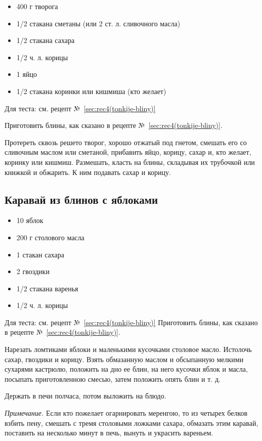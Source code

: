 \begin{itemize}
	\item 400 г творога 
    \item 1/2 стакана сметаны (или 2 ст. л. сливочного масла) 
    \item 1/2 стакана сахара
    \item 1/2 ч. л. корицы 
    \item 1 яйцо 
    \item 1/2 стакана коринки или кишмиша (кто желает)
\end{itemize}

Для теста: см. рецепт №~\ref{sec:rec4(tonkije-bliny)}

Приготовить блины, как сказано в рецепте №~\ref{sec:rec4(tonkije-bliny)}.

Протереть сквозь решето творог, хорошо отжатый под гнетом, смешать его со сливочным маслом или сметаной, прибавить яйцо, корицу, сахар и, кто желает, коринку или кишмиш. Размешать, класть на блины, складывая их трубочкой или книжкой и обжарить. К ним подавать сахар и корицу.

\subsection{Каравай из блинов с яблоками}

\begin{itemize}
	\item 10 яблок 
    \item 200 г столового масла 
    \item 1 стакан сахара 
    \item 2 гвоздики 
    \item 1/2 стакана варенья 
    \item 1/2 ч. л. корицы 
\end{itemize}

Для теста: см. рецепт №~\ref{sec:rec4(tonkije-bliny)}
Приготовить блины, как сказано в рецепте №~\ref{sec:rec4(tonkije-bliny)}.

Нарезать ломтиками яблоки и маленькими кусочками столовое масло. Истолочь сахар, гвоздики и корицу. Взять обмазанную маслом и обсыпанную мелкими сухарями кастрюлю, положить на дно ее блин, на него кусочки яблок и масла, посыпать приготовленною смесью, затем положить опять блин и т. д.

Держать в печи полчаса, потом выложить на блюдо.

\emph{Примечание.} Если кто пожелает огарнировать меренгою, то из четырех белков взбить пену, смешать с тремя столовыми ложками сахара, обмазать этим каравай, поставить на несколько минут в печь, вынуть и украсить вареньем.

